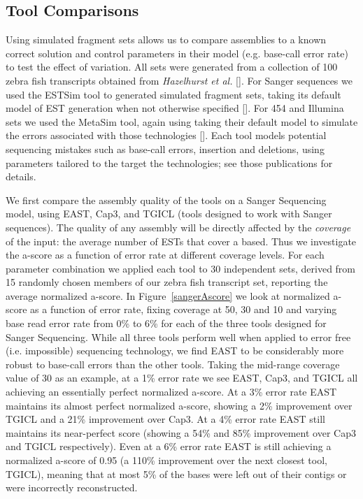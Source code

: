 \documentclass{bioinfo}
\newcommand{\capthree} {{\small Cap3}}
\newcommand{\estsim}{{\small ESTSim}}
\newcommand{\metasim} {{\small MetaSim}}
\newcommand{\tgicl} {{\small TGICL}}
\newcommand{\east} {{\small EAST}}
\begin{document}
\subsection*{Tool Comparisons}
Using simulated fragment sets allows us to compare assemblies to a
known correct solution and control parameters in their model
(e.g. base-call error rate) to test the effect of variation.  All sets
were generated from a collection of 100 zebra fish transcripts
obtained from {\it Hazelhurst et al.}  [\cite{Hazelhurst08}].  For
Sanger sequences we used the \estsim\/ tool to generated simulated
fragment sets, taking its default model of EST generation when not
otherwise specified [\cite{Hazelhurst03}].  For 454 and Illumina sets
we used the \metasim\/ tool, again using taking their default model to
simulate the errors associated with those technologies
[\cite{Richter08}].  Each tool models potential sequencing mistakes
such as base-call errors, insertion and deletions, using parameters
tailored to the target the technologies; see those publications for
details.


 We first compare the assembly
quality of the tools on a Sanger Sequencing model, using \east,
\capthree, and \tgicl\/ (tools designed to work with Sanger
sequences).  The quality of any assembly will be directly affected by
the {\it coverage} of the input: the average number of ESTs that cover
a based.  Thus we investigate the a-score as a function of error rate
at different coverage levels.  For each parameter combination we
applied each tool to 30 independent sets, derived from 15 randomly
chosen members of our zebra fish transcript set, reporting the average
normalized a-score.  In Figure~\ref{sangerAscore} we look at
normalized a-score as a function of error rate, fixing coverage at 50,
30 and 10 and varying base read error rate from 0\% to 6\% for each of
the three tools designed for Sanger Sequencing.  While all three tools
perform well when applied to error free (i.e. impossible) sequencing
technology, we find \east\/ to be considerably more robust to
base-call errors than the other tools.  Taking the mid-range coverage
value of 30 as an example, at a 1\% error rate we see \east,
\capthree, and \tgicl\/ all achieving an essentially perfect
normalized a-score.  At a 3\% error rate \east\/ maintains its almost
perfect normalized a-score, showing a 2\% improvement over \tgicl\/
and a 21\% improvement over \capthree.  At a 4\% error rate \east\/
still maintains its near-perfect score (showing a 54\% and 85\%
improvement over \capthree\/ and \tgicl\/ respectively).  Even at a
6\% error rate \east\/ is still achieving a normalized a-score of 0.95
(a 110\% improvement over the next closest tool, \tgicl\/), meaning
that at most 5\% of the bases were left out of their contigs or were
incorrectly reconstructed.
\end{document}
